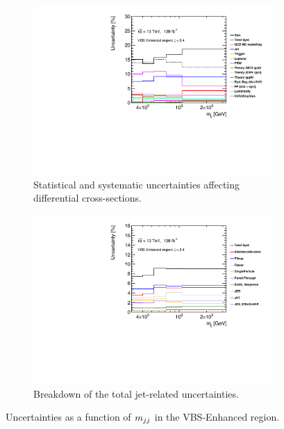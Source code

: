 \begin{figure}[!htb]
    \centering
    \begin{subfigure}{.48\textwidth}
        \centering
        \includegraphics[width=.98\linewidth]{figures/Analysis/Systematics/systematics_VBS_Enhanced.pdf}
        \caption{ Statistical and systematic uncertainties affecting differential cross-sections. \label{fig:sys_mjj_VBS_Enhanced_total}}
    \end{subfigure}
    \begin{subfigure}{.48\textwidth}
        \centering
        \includegraphics[width=.98\linewidth]{figures/Analysis/Systematics/jet_systematics_VBS_Enhanced.pdf}
        \caption{Breakdown of the total jet-related uncertainties. \label{fig:sys_mjj_VBS_Enhanced_jet} }
    \end{subfigure}
    \caption{Uncertainties as a function of $m_{jj}$ in the VBS-Enhanced region. \label{fig:sys_mjj_VBS_Enhanced}}
    \end{figure}